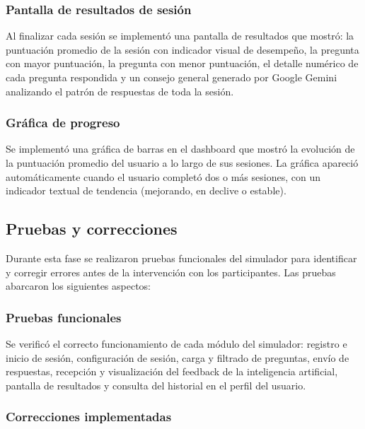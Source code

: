 \subsubsection{Pantalla de resultados de sesión}

Al finalizar cada sesión se implementó una pantalla de resultados
que mostró: la puntuación promedio de la sesión con indicador visual
de desempeño, la pregunta con mayor puntuación, la pregunta con
menor puntuación, el detalle numérico de cada pregunta respondida
y un consejo general generado por Google Gemini analizando el
patrón de respuestas de toda la sesión.

\subsubsection{Gráfica de progreso}

Se implementó una gráfica de barras en el dashboard que mostró la
evolución de la puntuación promedio del usuario a lo largo de sus
sesiones. La gráfica apareció automáticamente cuando el usuario
completó dos o más sesiones, con un indicador textual de tendencia
(mejorando, en declive o estable).

\subsection{Pruebas y correcciones}

Durante esta fase se realizaron pruebas funcionales del simulador
para identificar y corregir errores antes de la intervención con
los participantes. Las pruebas abarcaron los siguientes aspectos:

\subsubsection{Pruebas funcionales}

Se verificó el correcto funcionamiento de cada módulo del simulador:
registro e inicio de sesión, configuración de sesión, carga y
filtrado de preguntas, envío de respuestas, recepción y visualización
del feedback de la inteligencia artificial, pantalla de resultados
y consulta del historial en el perfil del usuario.

\subsubsection{Correcciones implementadas}

